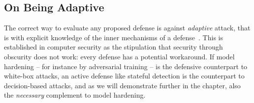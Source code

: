 

\subsection{On Being Adaptive}

The correct way to evaluate any proposed defense is against \emph{adaptive} attack, that is with explicit knowledge of the inner mechanisms of a defense~\cite{tramer2020adaptive}.
This is established in computer security as the stipulation that security through obscurity does not work: every defense has a potential workaround.
If model hardening -- for instance by adversarial training -- is the defensive counterpart to white-box attacks, an active defense like stateful detection is the counterpart to decision-based attacks, and as we will demonstrate further in the chapter, also the \emph{necessary} complement to model hardening.


